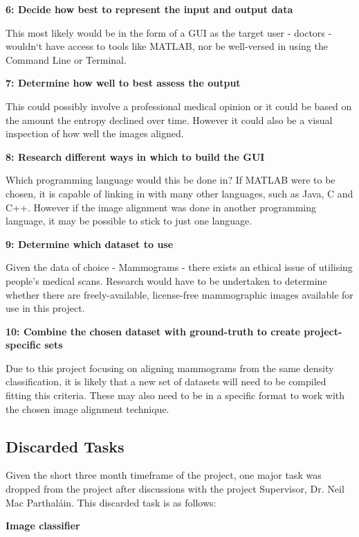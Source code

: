 \noindent \textbf{6: Decide how best to represent the input and output data}

This most likely would be in the form of a \acrshort{GUI} as the target user - doctors - wouldn`t have access to tools like MATLAB, nor be well-versed in using the Command Line or Terminal.

\noindent \textbf{7: Determine how well to best assess the output}

This could possibly involve a professional medical opinion or it could be based on the amount the entropy declined over time. However it could also be a visual inspection of how well the images aligned.

\noindent \textbf{8: Research different ways in which to build the \acrshort{GUI}}

Which programming language would this be done in? If MATLAB were to be chosen, it is capable of linking in with many other languages, such as Java, C and C++. However if the image alignment was done in another programming language, it may be possible to stick to just one language.

\vspace{2cm}
\noindent \textbf{9: Determine which dataset to use}

Given the data of choice - Mammograms - there exists an ethical issue of utilising people's medical scans. Research would have to be undertaken to determine whether there are freely-available, license-free mammographic images available for use in this project.

\noindent \textbf{10: Combine the chosen dataset with ground-truth to create project-specific sets}

Due to this project focusing on aligning mammograms from the same density classification, it is likely that a new set of datasets will need to be compiled fitting this criteria. These may also need to be in a specific format to work with the chosen image alignment technique.

\subsection{Discarded Tasks}

Given the short three month timeframe of the project, one major task was dropped from the project after discussions with the project Supervisor, Dr. Neil Mac Parthal\'ain. This discarded task is as follows:

\noindent \textbf{Image classifier}

